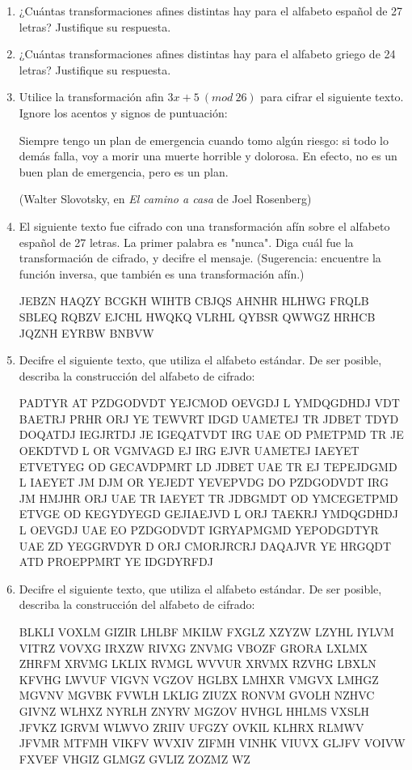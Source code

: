 \documentclass[12pt]{article}
\begin{document}
\begin{enumerate}
\item ¿Cuántas transformaciones afines distintas hay para el alfabeto español de 27 letras? Justifique su respuesta.

\item ¿Cuántas transformaciones afines distintas hay para el alfabeto griego de 24 letras? Justifique su respuesta.

\item Utilice la transformación afin $3x + 5\ (mod\ 26)$ para cifrar el siguiente texto. Ignore los acentos y signos de puntuación:

Siempre tengo un plan de emergencia cuando  tomo algún riesgo: si todo lo demás falla, voy a morir una muerte horrible
y dolorosa. En efecto, no es un buen plan de emergencia, pero
es un plan.

(Walter Slovotsky, en {\it El camino a casa} de Joel Rosenberg)

\item El siguiente texto fue cifrado con una transformación afín sobre el alfabeto español de 27 letras.
La primer palabra es "nunca". Diga cuál fue la transformación de cifrado, y decifre el mensaje. (Sugerencia: encuentre la función inversa, que también es una transformación afín.)

JEBZN HAQZY BCGKH WIHTB CBJQS AHNHR HLHWG FRQLB SBLEQ
RQBZV EJCHL HWQKQ VLRHL QYBSR QWWGZ HRHCB JQZNH EYRBW
BNBVW

\item Decifre el siguiente texto, que utiliza el alfabeto estándar. De ser posible, describa la construcción del alfabeto de cifrado:

PADTYR AT PZDGODVDT YEJCMOD OEVGDJ L YMDQGDHDJ VDT BAETRJ
PRHR ORJ YE TEWVRT IDGD UAMETEJ TR JDBET TDYD DOQATDJ
IEGJRTDJ JE IGEQATVDT IRG UAE OD PMETPMD TR JE OEKDTVD
L OR VGMVAGD EJ IRG EJVR UAMETEJ IAEYET ETVETYEG OD
GECAVDPMRT LD JDBET UAE TR EJ TEPEJDGMD L IAEYET JM
DJM OR YEJEDT YEVEPVDG DO PZDGODVDT IRG JM HMJHR ORJ
UAE TR IAEYET TR JDBGMDT OD YMCEGETPMD ETVGE OD KEGYDYEGD
GEJIAEJVD L ORJ TAEKRJ YMDQGDHDJ L OEVGDJ UAE EO PZDGODVDT
IGRYAPMGMD YEPODGDTYR UAE ZD YEGGRVDYR D ORJ CMORJRCRJ
DAQAJVR YE HRGQDT ATD PROEPPMRT YE IDGDYRFDJ


\item Decifre el siguiente texto, que utiliza el alfabeto estándar. De ser posible, describa la construcción del alfabeto de cifrado: 

BLKLI VOXLM GIZIR LHLBF MKILW FXGLZ XZYZW LZYHL IYLVM
VITRZ VOVXG IRXZW RIVXG ZNVMG VBOZF GRORA LXLMX ZHRFM
XRVMG LKLIX RVMGL WVVUR XRVMX RZVHG LBXLN KFVHG LWVUF
VIGVN VGZOV HGLBX LMHXR VMGVX LMHGZ MGVNV MGVBK FVWLH
LKLIG ZIUZX RONVM GVOLH NZHVC GIVNZ WLHXZ NYRLH ZNYRV
MGZOV HVHGL HHLMS VXSLH JFVKZ IGRVM WLWVO ZRIIV UFGZY
OVKIL KLHRX RLMWV JFVMR MTFMH VIKFV WVXIV ZIFMH VINHK
VIUVX GLJFV VOIVW FXVEF VHGIZ GLMGZ GVLIZ ZOZMZ WZ

\end{enumerate}
\end{document}
